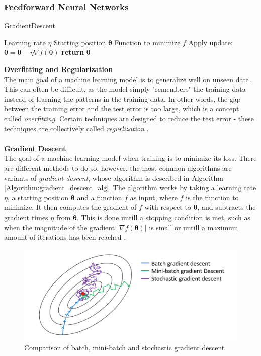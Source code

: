 \documentclass[./main.tex]{subfiles}
\begin{document}
\subsubsection{Feedforward Neural Networks} \label{subsubsec:FeedforwardNN}
\begin{algorithm}[htbp]
    \caption{GradientDescent \cite{d2l}}
    \label{Algorithm:gradient_descent_alg}
    \begin{algorithmic}[1]
        \Require Learning rate $\eta$
        \Require Starting position $\bm{\theta}$
        \Require Function to minimize $f$
            \State Apply update: $\bm{\theta} = \bm{\theta} - \eta \nabla f(\bm{\theta})$
        \EndWhile
        \State \textbf{return} $\bm{\theta}$
    \end{algorithmic}
\end{algorithm}
\noindent \textbf{Overfitting and Regularization} \\
The main goal of a machine learning model is to generalize well on unseen data. This can often be difficult, as the model simply "remembers" the training data instead of learning the patterns in the training data. In other words, the gap between the training error and the test error is too large, which is a concept called \textit{overfitting}. Certain techniques are designed to reduce the test error - these techniques are collectively called \textit{regurlization} \cite{DeepLearning}. 
\\
\\
\textbf{Gradient Descent} \\
The goal of a machine learning model when training is to minimize its loss. There are different methods to do so, however, the most common algorithms are variants of \textit{gradient descent}, whose algorithm is described in Algorithm \ref{Algorithm:gradient_descent_alg}. The algorithm works by taking a learning rate $\eta$, a starting position $\bm{\theta}$ and a function $f$ as input, where $f$ is the function to minimize. It then computes the gradient of $f$ with respect to $\bm{\theta}$, and subtracts the gradient times $\eta$ from $\bm{\theta}$. This is done untill a stopping condition is met, such as when the magnitude of the gradient $\left| \nabla f(\bm{\theta}) \right|$ is small or untill a maximum amount of iterations has been reached \cite{d2l}.
\begin{figure}
    \centering
    \includegraphics[width = 8 cm]{entities/batch_methods.PNG}
    \caption{Comparison of batch, mini-batch and stochastic gradient descent \cite{EML_optimization}}
    \label{fig:batch_methods}
\end{figure}
\end{document}
